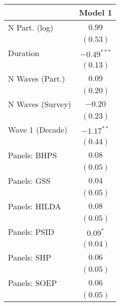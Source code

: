
\begin{table}
\begin{center}
\begin{tabular}{l c}
\hline
 & Model 1 \\
\hline
N Part. (log)                                      & $0.99$        \\
                                                   & $(0.53)$      \\
Duration                                           & $-0.49^{***}$ \\
                                                   & $(0.13)$      \\
N Waves (Part.)                                    & $0.09$        \\
                                                   & $(0.20)$      \\
N Waves (Survey)                                   & $-0.20$       \\
                                                   & $(0.23)$      \\
Wave 1 (Decade)                                    & $-1.17^{**}$  \\
                                                   & $(0.44)$      \\
Panels: BHPS                                       & $0.08$        \\
                                                   & $(0.05)$      \\
Panels: GSS                                        & $0.04$        \\
                                                   & $(0.05)$      \\
Panels: HILDA                                      & $0.08$        \\
                                                   & $(0.05)$      \\
Panels: PSID                                       & $0.09^{*}$    \\
                                                   & $(0.04)$      \\
Panels: SHP                                        & $0.06$        \\
                                                   & $(0.05)$      \\
Panels: SOEP                                       & $0.06$        \\
                                                   & $(0.05)$      \\

\end{tabular}
\end{center}
\end{table}
